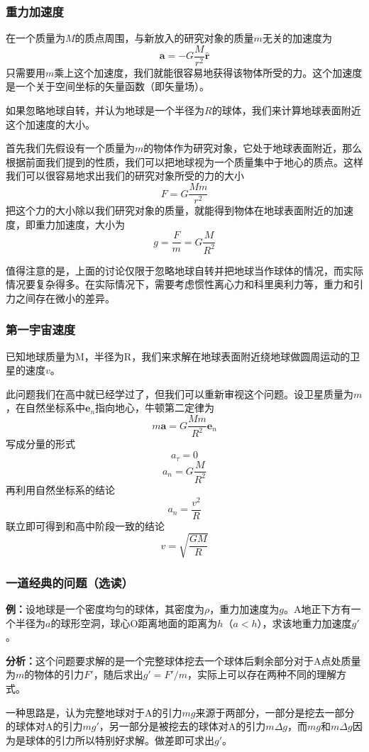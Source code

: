 \subsubsection{重力加速度}
在一个质量为$M$的质点周围，与新放入的研究对象的质量$m$无关的加速度为
\[
\mathbf{a} = -G \frac{M}{r^2} \hat{\mathbf{r}}
\]
只需要用$m$乘上这个加速度，我们就能很容易地获得该物体所受的力。这个加速度是一个关于空间坐标的矢量函数（即矢量场）。

如果忽略地球自转，并认为地球是一个半径为$R$的球体，我们来计算地球表面附近这个加速度的大小。

首先我们先假设有一个质量为$m$的物体作为研究对象，它处于地球表面附近，那么根据前面我们提到的性质，我们可以把地球视为一个质量集中于地心的质点。这样我们可以很容易地求出我们的研究对象所受的力的大小
\[
F = G \frac{Mm}{r^2}
\]
把这个力的大小除以我们研究对象的质量，就能得到物体在地球表面附近的加速度，即重力加速度，大小为
\[
g =\frac{F}{m}= G \frac{M}{R^2}
\]

值得注意的是，上面的讨论仅限于忽略地球自转并把地球当作球体的情况，而实际情况要复杂得多。在实际情况下，需要考虑惯性离心力和科里奥利力等，重力和引力之间存在微小的差异。
\subsubsection{第一宇宙速度}
已知地球质量为M，半径为R，我们来求解在地球表面附近绕地球做圆周运动的卫星的速度$v$。

此问题我们在高中就已经学过了，但我们可以重新审视这个问题。设卫星质量为$m$，在自然坐标系中$\mathbf e_n$指向地心，牛顿第二定律为
\[
m \mathbf a = G \frac{Mm}{R^2} \mathbf e_n
\]
写成分量的形式
\[
a_\tau = 0
\]
\[
a_n =G \frac{M}{R^2}
\]
再利用自然坐标系的结论
\[
a_n = \frac{v^2}{R}
\]
联立即可得到和高中阶段一致的结论
\[
v = \sqrt{\frac{GM}{R}}
\]
\subsubsection{一道经典的问题（选读）}
\noindent \textbf{例：}设地球是一个密度均匀的球体，其密度为$\rho$，重力加速度为$g$。A地正下方有一个半径为$a$的球形空洞，球心O距离地面的距离为$h$（$a<h$），求该地重力加速度$g'$。

\noindent \textbf{分析：}这个问题要求解的是一个完整球体挖去一个球体后剩余部分对于A点处质量为$m$的物体的引力$F'$，随后求出$g' = F'/m$，实际上可以存在两种不同的理解方式。

一种思路是，认为完整地球对于A的引力$mg$来源于两部分，一部分是挖去一部分的球体对A的引力$mg'$，另一部分是被挖去的球体对A的引力$m\Delta g$，而$mg$和$m\Delta g$因为是球体的引力所以特别好求解。做差即可求出$g'$。

